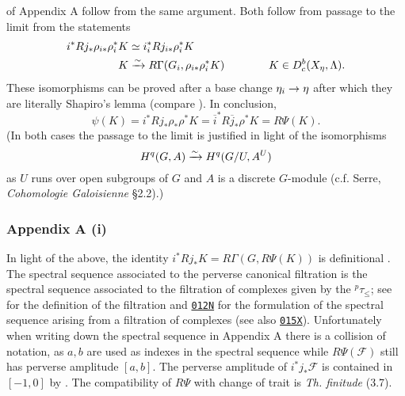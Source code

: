 \documentclass[deligne.tex]{subfiles}
\begin{document}
of Appendix A follow from the same argument.
Both follow from passage to the limit from the statements
\begin{align*}
	i^*Rj_*\rho_{i*}\rho_i^*K&\simeq i_i^*Rj_{i*}\rho_i^*K \\
	K&\xrightarrow\sim R\Gamma(G_i,\rho_{i*}\rho^*_iK)\qquad\qquad K\in D^b_c(X_\eta,\Lambda).
\end{align*}
These isomorphisms can be proved after a base change $\eta_i\rightarrow\eta$
after which they are literally Shapiro's lemma
(compare \cite[XIII \S1]{SGA7}). In conclusion,
\begin{equation*}
	\psi(K)=i^*Rj_*\rho_*\rho^*K
	=\overline i^*R\overline j_*\rho^*K=R\Psi(K).
\end{equation*}
(In both cases the passage to the limit is justified in light of the
isomorphisms
\begin{equation*}
	H^q(G,A)\xrightarrow\sim H^q(G/U,A^U)
\end{equation*}
as $U$ runs over open subgroups of $G$ and $A$ is a discrete $G$-module
(c.f. Serre, \emph{Cohomologie Galoisienne} \S2.2).)

\subsubsection*{Appendix A (i)}
In light of the above, the identity $i^*Rj_*K=R\Gamma(G,R\Psi(K))$ is 
definitional \cite[3.1.3]{Illusie}. The spectral sequence associated to the
perverse canonical filtration is the spectral sequence associated to
the filtration of complexes given by the $^p\tau_{\leq}$; see
\cite[\S3.1.5]{BBD} for the definition of the filtration and
\href{https://stacks.math.columbia.edu/tag/012N}{\texttt{012N}}
for the formulation of the spectral sequence arising from a filtration of
complexes (see also
\href{https://stacks.math.columbia.edu/tag/015X}{\texttt{015X}}). 
Unfortunately when writing down the spectral sequence in
Appendix A there is a collision of notation, as $a,b$ are
used as indexes in the spectral sequence while $R\Psi(\mathcal F)$ still 
has perverse amplitude $[a,b]$.
The perverse amplitude of $i^*j_*\mathcal F$ is contained in $[-1,0]$ by
\cite[4.1.10 (ii)]{BBD}. The compatibility of $R\Psi$ with change of trait
is \emph{Th. finitude} (3.7).
\end{document}
